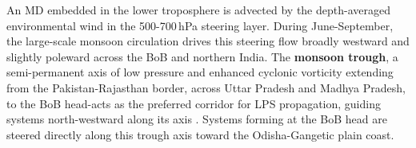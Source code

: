 An MD embedded in the lower troposphere is advected by the
depth-averaged environmental wind in the 500-700\,hPa steering layer.
During June-September, the large-scale monsoon circulation drives
this steering flow broadly westward  and slightly poleward across the
BoB and northern India. The \textbf{monsoon trough}, a semi-permanent
axis of low pressure and enhanced cyclonic vorticity extending from
the Pakistan-Rajasthan border, across Uttar Pradesh and Madhya
Pradesh, to the BoB head-acts as the preferred corridor for LPS
propagation, guiding systems north-westward along its axis
\autocite{sikka1977, mishra2021monsoon}. Systems forming at the BoB head
are steered directly along this trough axis toward the
Odisha-Gangetic plain coast.
%
%
%
%
%

